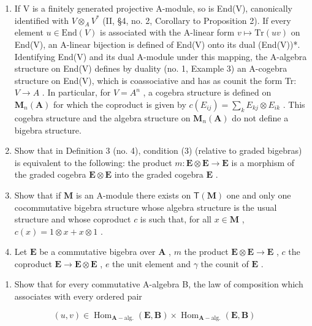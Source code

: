 \begin{enumerate}
\def\labelenumi{\arabic{enumi}.}
\item
  If V is a finitely generated projective A-module, so is End(V), canonically identified with \(V \otimes_{A} V^{*}\) (II, §4, no. 2, Corollary to Proposition 2). If every element \(u \in \text{End}(V)\) is associated with the A-linear form \(v \mapsto \text{Tr}(uv)\) on End(V), an A-linear bijection is defined of End(V) onto its dual (End(V))*. Identifying End(V) and its dual A-module under this mapping, the A-algebra structure on End(V) defines by duality (no. 1, Example 3) an A-cogebra structure on End(V), which is coassociative and has as counit the form Tr: \(V \to A\) . In particular, for \(V = A^{n}\) , a cogebra structure is defined on \(\mathbf{M}_{n}(\mathbf{A})\) for which the coproduct is given by \(c(E_{ij}) = \sum_{k} E_{kj} \otimes E_{ik}\) . This cogebra structure and the algebra structure on \(\mathbf{M}_{n}(\mathbf{A})\) do not define a bigebra structure.
\item
  Show that in Definition 3 (no. 4), condition (3) (relative to graded bigebras) is equivalent to the following: the product \(m: \mathbf{E} \otimes \mathbf{E} \to \mathbf{E}\) is a morphism of the graded cogebra \(\mathbf{E} \otimes \mathbf{E}\) into the graded cogebra \(\mathbf{E}\) .
\item
  Show that if \(\mathbf{M}\) is an A-module there exists on \(\mathsf{T}(\mathbf{M})\) one and only one cocommutative bigebra structure whose algebra structure is the usual structure and whose coproduct \(c\) is such that, for all \(x\in \mathbf{M}\) , \(c(x) = 1\otimes x + x\otimes 1\) .
\item
  Let \(\mathbf{E}\) be a commutative bigebra over \(\mathbf{A}\) , \(m\) the product \(\mathbf{E} \otimes \mathbf{E} \to \mathbf{E}\) , \(c\) the coproduct \(\mathbf{E} \to \mathbf{E} \otimes \mathbf{E}\) , \(e\) the unit element and \(\gamma\) the counit of \(\mathbf{E}\) .
\end{enumerate}

\begin{enumerate}
\def\labelenumi{(\alph{enumi})}
\tightlist
\item
  Show that for every commutative A-algebra B, the law of composition which associates with every ordered pair
\end{enumerate}

\[
(u, v) \in \operatorname{Hom} _ {\mathbf {A} - \mathrm{alg.}} (\mathbf {E}, \mathbf {B}) \times \operatorname{Hom} _ {\mathbf {A} - \mathrm{alg.}} (\mathbf {E}, \mathbf {B})
\]

